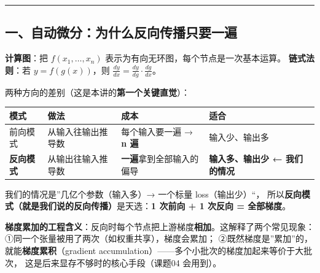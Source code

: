 \documentclass[
  chinese,
  11pt,
]{ctexart}
\newcounter{none} %
\begin{document}
\begin{center}\rule{0.5\linewidth}{0.5pt}\end{center}

\subsection{一、自动微分：为什么反向传播只要一遍}\label{ux4e00ux81eaux52a8ux5faeux5206ux4e3aux4ec0ux4e48ux53cdux5411ux4f20ux64adux53eaux8981ux4e00ux904d}

\textbf{计算图}：把 \(f(x_1,\dots,x_n)\) 表示为有向无环图，每个节点是一次基本运算。 \textbf{链式法则}：若 \(y = f(g(x))\)，则 \(\frac{dy}{dx} = \frac{dy}{dg}\cdot\frac{dg}{dx}\)。

两种方向的差别（这是本讲的\textbf{第一个关键直觉}）：

{\def\LTcaptype{none} %
\begin{longtable}[]{@{}
  >{\raggedright\arraybackslash}p{}
  >{\raggedright\arraybackslash}p{}
  >{\raggedright\arraybackslash}p{}
  >{\raggedright\arraybackslash}p{}@{}}
\toprule\noalign{}
\begin{minipage}[b]{\linewidth}\raggedright
模式
\end{minipage} & \begin{minipage}[b]{\linewidth}\raggedright
做法
\end{minipage} & \begin{minipage}[b]{\linewidth}\raggedright
成本
\end{minipage} & \begin{minipage}[b]{\linewidth}\raggedright
适合
\end{minipage} \\
\midrule\noalign{}
\endhead
\bottomrule\noalign{}
\endlastfoot
前向模式 & 从输入往输出推导数 & 每个输入要一遍 → \textbf{n 遍} & 输入少、输出多 \\
\textbf{反向模式} & 从输出往输入推导数 & \textbf{一遍}拿到全部输入的偏导 & \textbf{输入多、输出少 ← 我们的情况} \\
\end{longtable}
}

我们的情况是''几亿个参数（输入多）→ 一个标量 loss（输出少）``， 所以\textbf{反向模式（就是我们说的反向传播）}是天选：\textbf{1 次前向 + 1 次反向 = 全部梯度}。

\textbf{梯度累加的工程含义}：反向时每个节点把上游梯度\textbf{相加}。这解释了两个常见现象： ①同一个张量被用了两次（如权重共享），梯度会累加； ②既然梯度是''累加''的，就能\textbf{梯度累积}（gradient accumulation）------多个小批次的梯度加起来等价于大批次， 这是后来显存不够时的核心手段（课题04 会用到）。
\end{document}

